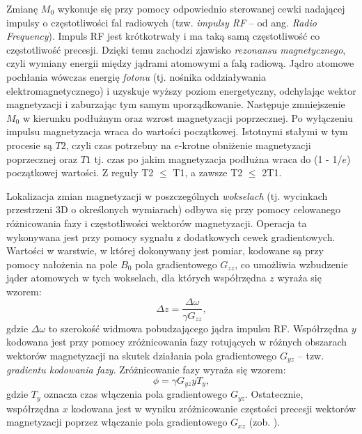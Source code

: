 Zmianę $M_0$ wykonuje się przy pomocy odpowiednio sterowanej cewki nadającej impulsy o częstotliwości fal radiowych (tzw. \textit{impulsy RF} -- od ang. \textit{Radio Frequency}). Impuls RF jest krótkotrwały i ma taką samą częstotliwość co częstotliwość precesji. Dzięki temu zachodzi zjawisko \textit{rezonansu magnetycznego}, czyli wymiany energii między jądrami atomowymi a falą radiową. Jądro atomowe pochłania wówczas energię \textit{fotonu} (tj. nośnika oddziaływania elektromagnetycznego) i uzyskuje wyższy poziom energetyczny, odchylając wektor magnetyzacji i zaburzając tym samym uporządkowanie. Następuje zmniejszenie $M_0$ w kierunku podłużnym oraz wzrost magnetyzacji poprzecznej. Po wyłączeniu impulsu magnetyzacja wraca do wartości początkowej. Istotnymi stałymi w tym procesie są $T2$, czyli czas potrzebny na $e$-krotne obniżenie magnetyzacji poprzecznej oraz $T1$ tj. czas po jakim magnetyzacja podłużna wraca do (1 - 1/$e$) początkowej wartości. Z reguły T2 $\leq$ T1, a zawsze T2 $\leq$ 2T1.   

Lokalizacja zmian magnetyzacji w poszczególnych \textit{wokselach} (tj. wycinkach przestrzeni 3D o określonych wymiarach) odbywa się przy pomocy celowanego różnicowania fazy i częstotliwości wektorów magnetyzacji. Operacja ta wykonywana jest przy pomocy sygnału z dodatkowych cewek gradientowych. Wartości w warstwie, \linebreak w której dokonywany jest pomiar, kodowane są przy pomocy nałożenia na pole $B_0$ pola gradientowego $G_{zz}$, co umożliwia wzbudzenie jąder atomowych w tych wokselach, dla których współrzędna $z$ wyraża się wzorem:
\begin{equation}
\Delta z = \frac{\Delta \omega}{\gamma G_{zz}},
\end{equation}
gdzie $\Delta \omega$ to szerokość widmowa pobudzającego jądra impulsu RF. Współrzędna \linebreak $y$ kodowana jest przy pomocy zróżnicowania fazy rotujących w różnych obszarach wektorów magnetyzacji na skutek działania pola gradientowego $G_{yz}$ -- tzw. \textit{gradientu kodowania fazy}. Zróżnicowanie fazy wyraża się wzorem:
\begin{equation}
\phi = \gamma G_{yz}yT_{y},
\end{equation}
gdzie $T_y$ oznacza czas włączenia pola gradientowego $G_{yz}$. Ostatecznie, współrzędna $x$ kodowana jest w wyniku zróżnicowanie częstości precesji wektorów magnetyzacji poprzez włączanie pola gradientowego $G_{xz}$ (zob. \cite{ObrazowanieMedyczne}). 

